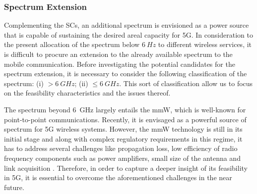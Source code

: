 \subsubsection*{Spectrum Extension }
Complementing the SCs, an additional spectrum %
is envisioned as a power source that is capable of sustaining the desired areal capacity for 5G. In consideration to the present allocation of the spectrum below $\SI{6}{Hz}$ to different wireless services, it is difficult to procure an extension to the already available spectrum to the mobile communication. Before investigating the potential candidates for the spectrum extension, it is necessary to consider the following classification of the spectrum:
(i) $> \SI{6}{GHz}$;
(ii) $\le \SI{6}{GHz}$.
This sort of classification allow us to focus on the feasibility characteristics and the issues thereof.


The spectrum beyond \SI{6}{GHz} largely entails the mmW, which is well-known for point-to-point communications. Recently, it is envisaged as a powerful source of spectrum for 5G wireless systems. However, the mmW technology is still in its initial stage and along with complex regulatory requirements in this regime, it has to address several challenges like propagation loss, low efficiency of radio frequency components such as power amplifiers, small size of the antenna and link acquisition \cite{Rapp13}. Therefore, in order to capture a deeper insight of its feasibility in 5G, it is essential to overcome the aforementioned challenges in the near future.%


